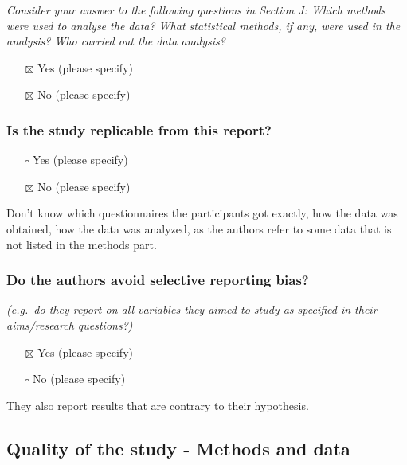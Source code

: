 \documentclass[
  doc, a4paper]{apa7}
\providecommand{\tightlist}{%
  \setlength{\itemsep}{0pt}\setlength{\parskip}{0pt}}
\begin{document}
\emph{Consider your answer to the following questions in Section J: Which methods were used to analyse the data? What statistical methods, if any, were used in the analysis? Who carried out the data analysis?}

\begin{itemize}
\tightlist
\item[$\boxtimes$]
  Yes (please specify)
\item[$\boxtimes$]
  No (please specify)
\end{itemize}

\subsubsection{Is the study replicable from this report?}\label{is-the-study-replicable-from-this-report}

\begin{itemize}
\tightlist
\item[$\square$]
  Yes (please specify)
\item[$\boxtimes$]
  No (please specify)
\end{itemize}

Don't know which questionnaires the participants got exactly, how the data was obtained, how the data was analyzed, as the authors refer to some data that is not listed in the methods part.

\subsubsection{Do the authors avoid selective reporting bias?}\label{do-the-authors-avoid-selective-reporting-bias}

\emph{(e.g.~do they report on all variables they aimed to study as specified in their aims/research questions?)}

\begin{itemize}
\tightlist
\item[$\boxtimes$]
  Yes (please specify)
\item[$\square$]
  No (please specify)
\end{itemize}

They also report results that are contrary to their hypothesis.

\subsection{Quality of the study - Methods and data}\label{quality-of-the-study---methods-and-data}
\end{document}
